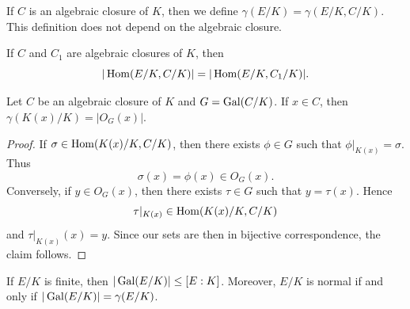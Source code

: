 If $C$ is an algebraic closure of $K$,
then we define $\gamma(E/K)=\gamma(E/K,C/K)$. This definition does
not depend on the algebraic closure. 

\begin{exercise}
\label{xca:gamma_C}
    If $C$ and $C_1$ are algebraic closures of $K$, then
    \[
    |\operatorname{Hom}(E/K,C/K)|=|\operatorname{Hom}(E/K,C_1/K)|.
    \]
\end{exercise}

\begin{proposition}
\label{pro:gamma_orbit}
    Let $C$ be an algebraic closure of $K$ and $G=\operatorname{Gal}(C/K)$. 
    If $x\in C$, then $\gamma(K(x)/K)=|O_G(x)|$. 
\end{proposition}

\begin{proof}
    If $\sigma\in\operatorname{Hom}(K(x)/K,C/K)$, then there exists $\phi\in G$ such that
    $\phi|_{K(x)}=\sigma$. Thus 
    \[
    \sigma(x)=\phi(x)\in O_G(x).
    \]
    Conversely,
    if $y\in O_G(x)$, then there exists $\tau\in G$ such that
    $y=\tau(x)$. Hence 
    \[
    \tau|_{K(x)}\in\operatorname{Hom}(K(x)/K,C/K)
    \]
    and 
    $\tau|_{K(x)}(x)=y$. Since our sets are then in bijective correspondence, 
    the claim follows. 
\end{proof}


\begin{exercise}
If $E/K$ is finite, then $|\operatorname{Gal}(E/K)|\leq [E:K]$. Moreover, 
$E/K$ is normal if and only if $|\operatorname{Gal}(E/K)|=\gamma(E/K)$. 
\end{exercise}

